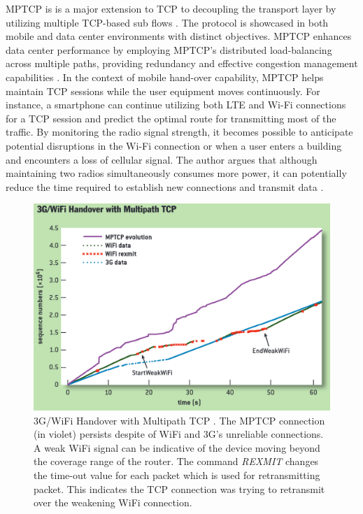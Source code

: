 \ac{MPTCP} is is a major extension to TCP to decoupling the transport layer by utilizing multiple TCP-based sub flows \cite{Bonaventure_mptcp_decoupling}.
The protocol is showcased in both mobile and data center environments with distinct objectives. 
\ac{MPTCP} enhances data center performance by employing \ac{MPTCP}'s distributed load-balancing across multiple paths, providing redundancy and effective congestion management capabilities \cite{raiciu_improving_nodate}.
In the context of mobile hand-over capability, \ac{MPTCP} helps maintain TCP sessions while the user equipment moves continuously. 
For instance, a smartphone can continue utilizing both LTE and Wi-Fi connections for a TCP session and predict the optimal route for transmitting most of the traffic. 
By monitoring the radio signal strength, it becomes possible to anticipate potential disruptions in the Wi-Fi connection or when a user enters a building and encounters a loss of cellular signal. 
The author argues that although maintaining two radios simultaneously consumes more power, it can potentially reduce the time required to establish new connections and transmit data \cite{paasch_multipath_2014}.

\begin{figure}[H]
	\centering
	\includegraphics[width=1.0\textwidth]{resources/images/3G_WiFi_Handover_with_Multipath_TCP.PNG}
	\caption{3G/WiFi Handover with Multipath TCP \cite{paasch_multipath_2014}. The MPTCP connection (in violet) persists despite of WiFi and 3G's unreliable connections. A weak WiFi signal can be indicative of the device moving beyond the coverage range of the router. The command \textit{REXMIT} changes the time-out value for each packet which is used for retransmitting packet. This indicates the TCP connection was trying to retransmit over the weakening WiFi connection.}
    \label{fig:related_work:3G_WiFi_Handover_with_Multipath_TCP}
\end{figure}

